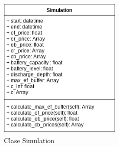 \begin{figure}[!h]
        \centering
        \includegraphics[width=6cm]{figs/simulation_class.png}
        \caption{Clase Simulation}
        \label{fig:simulation}
\end{figure}
